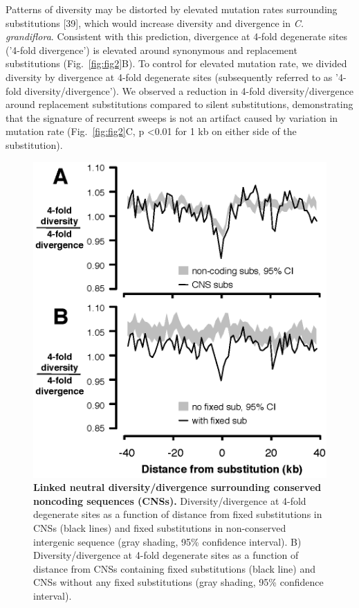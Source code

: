 Patterns of diversity may be distorted by elevated mutation rates surrounding substitutions [39], which would increase diversity and divergence in \textit{C. grandiflora}. Consistent with this prediction, divergence at 4-fold degenerate sites ('4-fold divergence') is elevated around synonymous and replacement substitutions (Fig.~\ref{fig:fig2}B). To control for elevated mutation rate, we divided diversity by divergence at 4-fold degenerate sites (subsequently referred to as '4-fold diversity/divergence'). We observed a reduction in 4-fold diversity/divergence around replacement substitutions compared to silent substitutions, demonstrating that the signature of recurrent sweeps is not an artifact caused by variation in mutation rate (Fig.~\ref{fig:fig2}C, p \textless  0.01 for 1 kb on either side of the substitution).

\begin{figure}[h]
      \centering
       \includegraphics{Ch2Fig3}
    \caption{\textbf{Linked neutral diversity/divergence surrounding conserved noncoding sequences (CNSs).} Diversity/divergence at 4-fold degenerate sites as a function of distance from fixed substitutions in CNSs (black lines) and fixed substitutions in non-conserved intergenic sequence (gray shading, 95\% confidence interval).
B) Diversity/divergence at 4-fold degenerate sites as a function of distance from CNSs containing fixed substitutions (black line) and CNSs without any fixed substitutions (gray shading, 95\% confidence interval).}
    \label{fig:fig3}
\end{figure}

